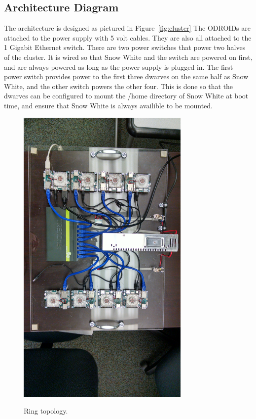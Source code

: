 \subsection{Architecture  Diagram}

The architecture is designed as pictured in Figure~\ref{fig:cluster} The ODROIDs are attached to the power supply with 5 volt cables. They are also all attached to the 1 Gigabit Ethernet switch. There are two power switches that power two halves of the cluster. It is wired so that Snow White and the switch are powered on first, and are always powered as long as the power supply is plugged in. The first power switch provides power to the first three dwarves on the same half as Snow White, and the other switch powers the other four. This is done so that the dwarves can be configured to mount the /home directory of Snow White at boot time, and ensure that Snow White is always availible to be mounted.

 \begin{figure}[tbh]
	\caption{Ring topology.}
	\centering
		\includegraphics[width=0.75\textwidth]{IMG_20151201_104751350_HDR.jpg}
	\label{fig:ring}
\end{figure}


